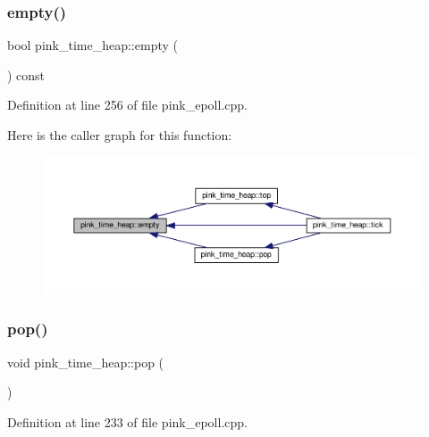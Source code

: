 \subsubsection{\texorpdfstring{empty()}{empty()}}
{\footnotesize\ttfamily bool pink\+\_\+time\+\_\+heap\+::empty (\begin{DoxyParamCaption}{ }\end{DoxyParamCaption}) const}



Definition at line 256 of file pink\+\_\+epoll.\+cpp.

Here is the caller graph for this function\+:
\nopagebreak
\begin{figure}[H]
\begin{center}
\leavevmode
\includegraphics[width=350pt]{classpink__time__heap_ade64cf32193747380cb57c5709e28383_icgraph}
\end{center}
\end{figure}
\mbox{\label{classpink__time__heap_a5642ee3340cdee7983ed63770e7109d1}} 
\subsubsection{\texorpdfstring{pop()}{pop()}}
{\footnotesize\ttfamily void pink\+\_\+time\+\_\+heap\+::pop (\begin{DoxyParamCaption}{ }\end{DoxyParamCaption})}



Definition at line 233 of file pink\+\_\+epoll.\+cpp.

